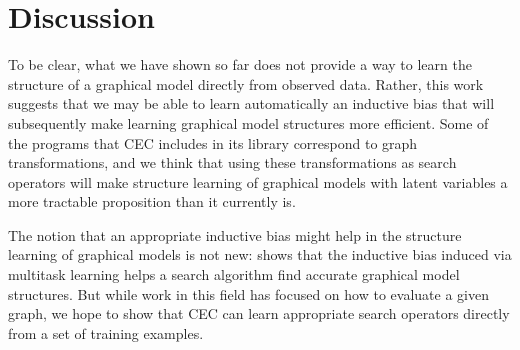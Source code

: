 \documentclass{article} %
\begin{document}
\section{Discussion}

To be clear, what we have shown so far does not provide a way to learn the structure of a graphical model directly from observed data. Rather, this work suggests that we may be able to learn automatically an inductive bias that will subsequently make learning graphical model structures more efficient. Some of the programs that CEC includes in its library correspond to graph transformations, and we think that using these transformations as search operators will make structure learning of graphical models with latent variables a more tractable proposition than it currently is. 

The notion that an appropriate inductive bias might help in the structure learning of graphical models is not new: \cite{DBLP:conf/icml/HonorioS10} shows that the inductive bias induced via multitask learning helps a search algorithm find accurate graphical model structures. But while work in this field has focused on how to evaluate a given graph, we hope to show that CEC can learn appropriate search operators directly from a set of training examples. 




\end{document}
